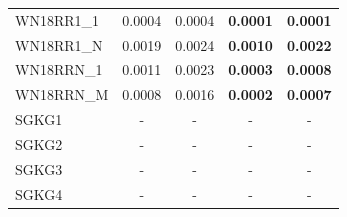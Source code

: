 \begin{table}[t]
{\begin{tabular}{l||cc||cc}
WN18RR1\_1 & 0.0004 & 0.0004 & \textbf{0.0001} & \textbf{0.0001} \\
WN18RR1\_N & 0.0019 & 0.0024 & \textbf{0.0010} & \textbf{0.0022} \\
WN18RRN\_1 & 0.0011 & 0.0023 & \textbf{0.0003} & \textbf{0.0008} \\
WN18RRN\_M & 0.0008 & 0.0016 & \textbf{0.0002} & \textbf{0.0007} \\
\hline
SGKG1 & - & - & - & - \\
SGKG2 & - & - & - & - \\
SGKG3 & - & - & - & - \\
SGKG4 & - & - & - & - \\
\hline
\end{tabular}%
}
\end{table}
